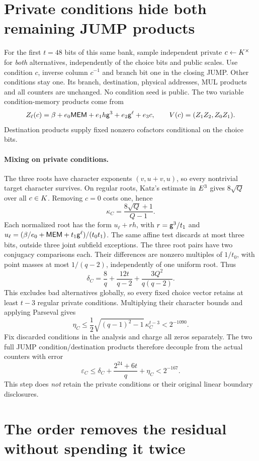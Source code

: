 \documentclass[11pt]{article}
\begin{document}
\section{Private conditions hide both remaining JUMP products}

For the first $t=48$ bits of this same bank, sample independent private $c\gets K^\times$ for \emph{both} alternatives, independently of the choice bits and public scales. Use condition $c$, inverse column $c^{-1}$ and branch bit one in the closing JUMP. Other conditions stay one. Its branch, destination, physical addresses, MUL products and all counters are unchanged. No condition seed is public. The two variable condition-memory products come from
\[
 Z_\ell(c)=\beta+e_0\mathsf{MEM}+e_1h\mathsf{g}^3+e_2\mathsf{g}^\ell+e_3c,
 \qquad V(c)=(Z_1Z_2,Z_0Z_1).
\]
Destination products supply fixed nonzero cofactors conditional on the choice bits.

\paragraph{Mixing on private conditions.} The three roots have character exponents $(v,u+v,u)$, so every nontrivial target character survives. On regular roots, Katz's estimate in $E^3$ gives $8\sqrt Q$ over all $c\in K$. Removing $c=0$ costs one, hence
\[
 \kappa_C=\frac{8\sqrt Q+1}{Q-1}.
\]
Each normalized root has the form $u_\ell+rh$, with $r=\mathsf{g}^3/t_1$ and $u_\ell=(\beta/e_0+\mathsf{MEM}+t_1\mathsf{g}^\ell)/(t_0t_1)$. The same affine test discards at most three bits, outside three joint subfield exceptions. The three root pairs have two conjugacy comparisons each. Their differences are nonzero multiples of $1/t_0$, with point masses at most $1/(q-2)$, independently of one uniform root. Thus
\[
 \delta_C=\frac8q+\frac{12t}{q-2}+\frac{3Q^2}{q(q-2)}.
\]
This excludes bad alternatives globally, so every fixed choice vector retains at least $t-3$ regular private conditions. Multiplying their character bounds and applying Parseval gives
\[
 \eta_C\le\frac12\sqrt{(q-1)^2-1}\,\kappa_C^{t-3}<2^{-1090}.
\]
Fix discarded conditions in the analysis and charge all zeros separately. The two full JUMP condition/destination products therefore decouple from the actual counters with error
\[
 \varepsilon_C\le\delta_C+\frac{2^{24}+6t}{q}+\eta_C<2^{-167}.
\]
This step does \emph{not} retain the private conditions or their original linear boundary disclosures.

\section{The order removes the residual without spending it twice}
\end{document}
